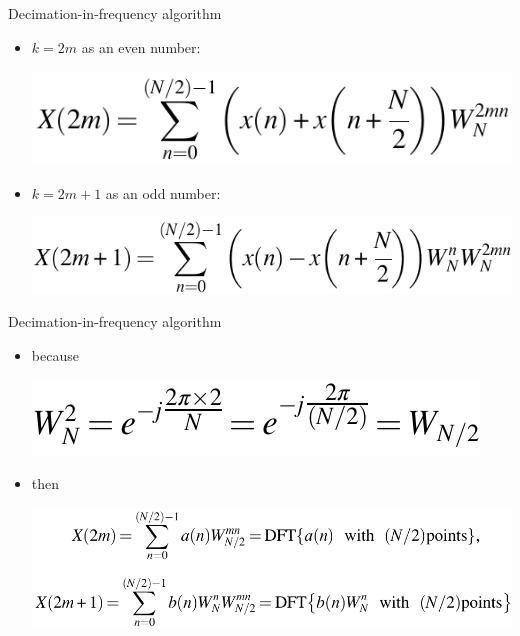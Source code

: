 \documentclass[pdflatex,compress,mathserif]{beamer}
\begin{document}
\begin{frame}{Decimation-in-frequency algorithm}
	\begin{itemize}
		\item $k = 2m$ as an even number:
		\begin{center}
			\includegraphics[width=0.7\linewidth]{img/img09}
		\end{center}
		\item $k = 2m+1$ as an odd number:
		\begin{center}
			\includegraphics[width=0.7\linewidth]{img/img10}
		\end{center}
	\end{itemize}
\end{frame}

\begin{frame}{Decimation-in-frequency algorithm}
	\begin{itemize}
		\item because
		\begin{center}
			\includegraphics[width=0.5\linewidth]{img/img11}
		\end{center}
		\item then
		\begin{center}
			\includegraphics[width=\linewidth]{img/img12}
		\end{center}
	\end{itemize}
\end{frame}
\end{document}
